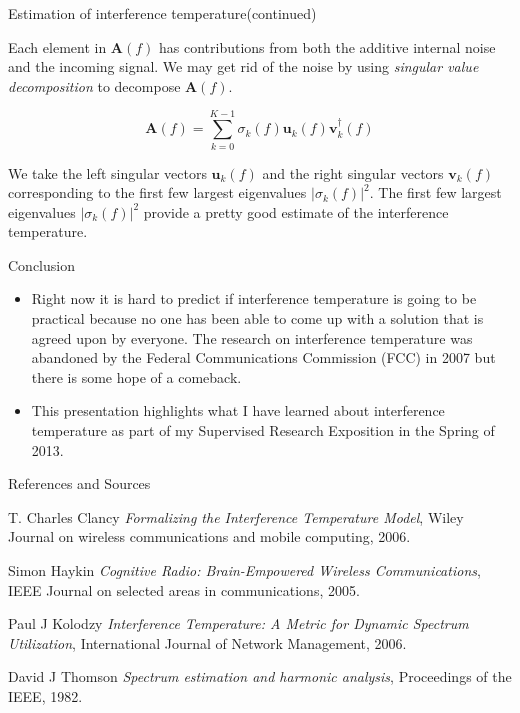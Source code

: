 \documentclass[mathserif]{beamer}
\begin{document}
\begin{frame}{Estimation of interference temperature(continued)}

Each element in $\mathbf{A}(f)$ has contributions from both the additive internal noise and the incoming signal. We may get rid of the noise by using \emph{singular value decomposition} to decompose $\mathbf{A}(f)$.

\begin{equation}
    \mathbf{A}(f) = \sum_{k=0}^{K-1} \sigma_k(f) \mathbf{u}_k(f) \mathbf{v}_k^{\dag}(f)
\end{equation}

We take the left singular vectors $\mathbf{u}_k(f)$ and the right singular vectors $\mathbf{v}_k(f)$ corresponding to the first few largest eigenvalues $|\sigma_k(f)|^2$. The first few largest eigenvalues $|\sigma_k(f)|^2$ provide a pretty good estimate of the interference temperature.

\end{frame}

\begin{frame}{Conclusion}

\begin{itemize}
	\item Right now it is hard to predict if interference temperature is going to be practical because no one has been able to come up with a solution that is agreed upon by everyone. The research on interference temperature was abandoned by the Federal Communications Commission (FCC) in 2007 but there is some hope of a comeback.
	\item This presentation highlights what I have learned about interference temperature as part of my Supervised Research Exposition in the Spring of 2013.

\end{itemize}
\end{frame}


\begin{frame}{References and Sources}

\begin{thebibliography}{10}

	T. Charles Clancy
    \newblock \emph{Formalizing the Interference Temperature Model},
    \newblock Wiley Journal on wireless communications and mobile computing, 2006.

    Simon Haykin
    \newblock  \emph{Cognitive Radio: Brain-Empowered Wireless Communications},
    \newblock IEEE Journal on selected areas in communications, 2005.

    Paul J Kolodzy
    \newblock \emph{Interference Temperature: A Metric for Dynamic Spectrum Utilization},
    \newblock International Journal of Network Management, 2006.

	David J Thomson
    \newblock \emph{Spectrum estimation and harmonic analysis},
    \newblock Proceedings of the IEEE, 1982.

\end{thebibliography}

\end{frame}
\end{document}
